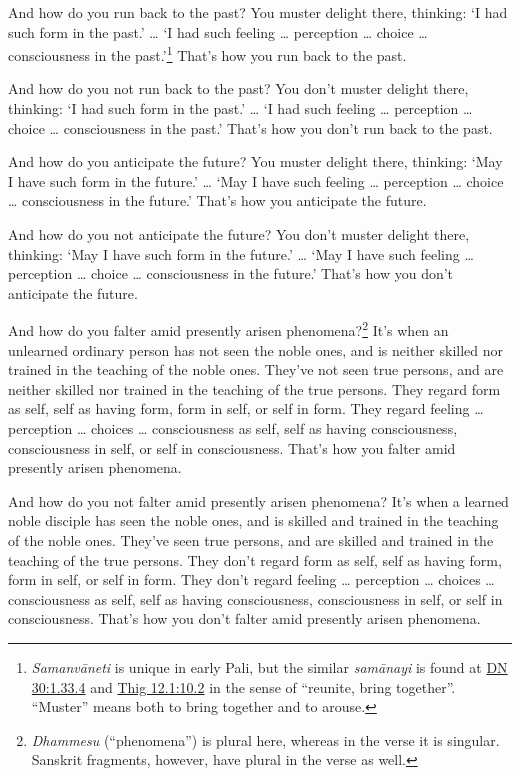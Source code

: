 \documentclass[12pt,openany]{book}%
\begin{document}
And how do you run back to the past? You muster delight there, thinking: ‘I had such form in the past.’ … ‘I had such feeling … perception … choice … consciousness in the past.’\footnote{\textit{\textsanskrit{Samanvāneti}} is unique in early Pali, but the similar \textit{\textsanskrit{samānayi}} is found at \href{https://suttacentral.net/dn30/en/sujato\#1.33.4}{DN 30:1.33.4} and \href{https://suttacentral.net/thig12.1/en/sujato\#10.2}{Thig 12.1:10.2} in the sense of “reunite, bring together”. “Muster” means both to bring together and to arouse. } That’s how you run back to the past. 

And how do you not run back to the past? You don’t muster delight there, thinking: ‘I had such form in the past.’ … ‘I had such feeling … perception … choice … consciousness in the past.’ That’s how you don’t run back to the past. 

And how do you anticipate the future? You muster delight there, thinking: ‘May I have such form in the future.’ … ‘May I have such feeling … perception … choice … consciousness in the future.’ That’s how you anticipate the future. 

And how do you not anticipate the future? You don’t muster delight there, thinking: ‘May I have such form in the future.’ … ‘May I have such feeling … perception … choice … consciousness in the future.’ That’s how you don’t anticipate the future. 

And how do you falter amid presently arisen phenomena?\footnote{\textit{Dhammesu} (“phenomena”) is plural here, whereas in the verse it is singular. Sanskrit fragments, however, have plural in the verse as well. } It’s when an unlearned ordinary person has not seen the noble ones, and is neither skilled nor trained in the teaching of the noble ones. They’ve not seen true persons, and are neither skilled nor trained in the teaching of the true persons. They regard form as self, self as having form, form in self, or self in form. They regard feeling … perception … choices … consciousness as self, self as having consciousness, consciousness in self, or self in consciousness. That’s how you falter amid presently arisen phenomena. 

And how do you not falter amid presently arisen phenomena? It’s when a learned noble disciple has seen the noble ones, and is skilled and trained in the teaching of the noble ones. They’ve seen true persons, and are skilled and trained in the teaching of the true persons. They don’t regard form as self, self as having form, form in self, or self in form. They don’t regard feeling … perception … choices … consciousness as self, self as having consciousness, consciousness in self, or self in consciousness. That’s how you don’t falter amid presently arisen phenomena. 
\end{document}
